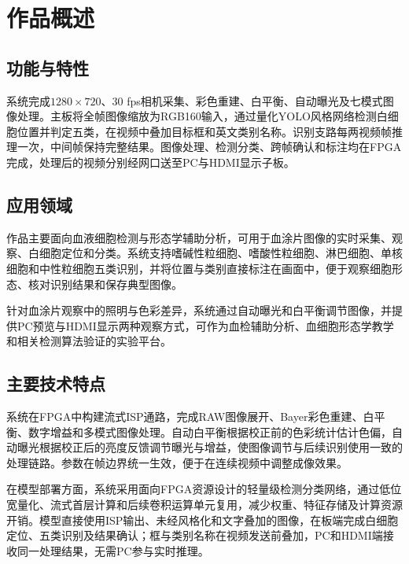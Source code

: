 \section{作品概述}
\subsection{功能与特性}
系统完成$1280\times720$、30 fps相机采集、彩色重建、白平衡、自动曝光及七模式图像处理。主板将全帧图像缩放为RGB160输入，通过量化YOLO风格网络检测白细胞位置并判定五类，在视频中叠加目标框和英文类别名称。识别支路每两视频帧推理一次，中间帧保持完整结果。图像处理、检测分类、跨帧确认和标注均在FPGA完成，处理后的视频分别经网口送至PC与HDMI显示子板。

\subsection{应用领域}
作品主要面向血液细胞检测与形态学辅助分析，可用于血涂片图像的实时采集、观察、白细胞定位和分类。系统支持嗜碱性粒细胞、嗜酸性粒细胞、淋巴细胞、单核细胞和中性粒细胞五类识别，并将位置与类别直接标注在画面中，便于观察细胞形态、核对识别结果和保存典型图像。

针对血涂片观察中的照明与色彩差异，系统通过自动曝光和白平衡调节图像，并提供PC预览与HDMI显示两种观察方式，可作为血检辅助分析、血细胞形态学教学和相关检测算法验证的实验平台。

\subsection{主要技术特点}
系统在FPGA中构建流式ISP通路，完成RAW图像展开、Bayer彩色重建、白平衡、数字增益和多模式图像处理。自动白平衡根据校正前的色彩统计估计色偏，自动曝光根据校正后的亮度反馈调节曝光与增益，使图像调节与后续识别使用一致的处理链路。参数在帧边界统一生效，便于在连续视频中调整成像效果。

在模型部署方面，系统采用面向FPGA资源设计的轻量级检测分类网络，通过低位宽量化、流式首层计算和后续卷积运算单元复用，减少权重、特征存储及计算资源开销。模型直接使用ISP输出、未经风格化和文字叠加的图像，在板端完成白细胞定位、五类识别及结果确认；框与类别名称在视频发送前叠加，PC和HDMI端接收同一处理结果，无需PC参与实时推理。

